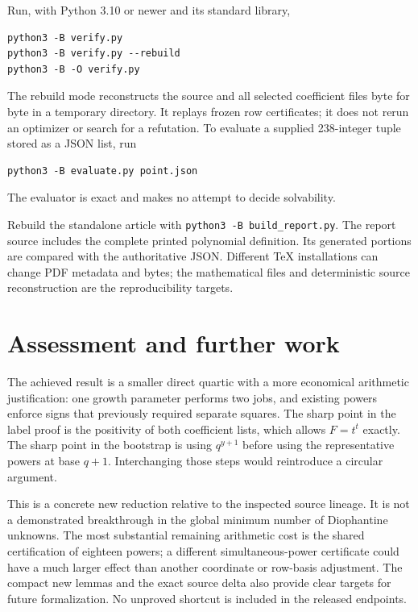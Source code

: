 Run, with Python 3.10 or newer and its standard library,
\begin{verbatim}
python3 -B verify.py
python3 -B verify.py --rebuild
python3 -B -O verify.py
\end{verbatim}
The rebuild mode reconstructs the source and all selected coefficient files
byte for byte in a temporary directory. It replays frozen row certificates;
it does not rerun an optimizer or search for a refutation. To evaluate a
supplied 238-integer tuple stored as a JSON list, run
\begin{verbatim}
python3 -B evaluate.py point.json
\end{verbatim}
The evaluator is exact and makes no attempt to decide solvability.

Rebuild the standalone article with \texttt{python3 -B build\_report.py}.
The report source includes the complete printed polynomial definition.
Its generated portions are compared with the authoritative JSON. Different
TeX installations can change PDF metadata and bytes; the mathematical files
and deterministic source reconstruction are the reproducibility targets.

\section{Assessment and further work}

The achieved result is a smaller direct quartic with a more economical
arithmetic justification: one growth parameter performs two jobs, and
existing powers enforce signs that previously required separate squares.
The sharp point in the label proof is the positivity of both coefficient
lists, which allows $F=t^t$ exactly. The sharp point in the bootstrap is
using $q^{y+1}$ before using the representative powers at base $q+1$.
Interchanging those steps would reintroduce a circular argument.

This is a concrete new reduction relative to the inspected source lineage.
It is not a demonstrated breakthrough in the global minimum number of
Diophantine unknowns. The most substantial remaining arithmetic cost is
the shared certification of eighteen powers; a different simultaneous-power
certificate could have a much larger effect than another coordinate or
row-basis adjustment. The compact new lemmas and the exact source delta
also provide clear targets for future formalization. No unproved shortcut
is included in the released endpoints.

